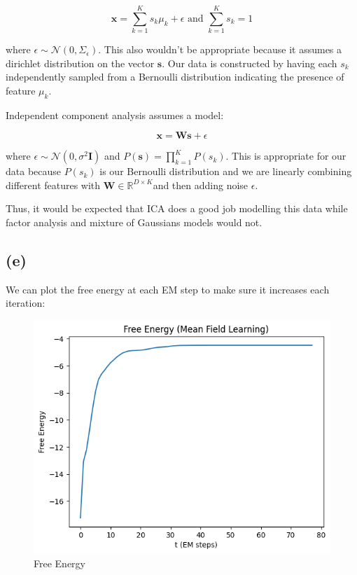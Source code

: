 \documentclass[12pt]{article}
\begin{document}
\[\textbf{x} = \sum_{k=1}^K s_k \mu_k + \epsilon \text{ and } \sum_{k=1}^K s_k = 1\]

where $\epsilon \sim \mathcal{N}(0, \Sigma_{\epsilon})$. This also wouldn't be appropriate because it assumes a dirichlet distribution on the vector $\textbf{s}$. Our data is constructed by having each $s_k$ independently sampled from a Bernoulli distribution indicating the presence of feature $\mu_k$.

Independent component analysis assumes a model:

\[\textbf{x} = \textbf{W}\textbf{s} + \epsilon\]

where $\epsilon \sim \mathcal{N}(0, \sigma^2\textbf{I})$ and $P(\textbf{s}) = \prod_{k=1}^K P(s_k)$. This is appropriate for our data because $P(s_k)$ is our Bernoulli distribution and we are linearly combining different features with $\textbf{W} \in \mathbb{R}^{D \times K}$and then adding noise $\epsilon$.

Thus, it would be expected that ICA does a good job modelling this data while factor analysis and mixture of Gaussians models would not.

\subsection*{(e)}

We can plot the free energy at each EM step to make sure it increases each iteration:

\begin{figure}[h]
\centering
\includegraphics[scale=0.4]{outputs/q3/f-free-energy}
\caption{Free Energy}
\label{fig:3f-free-energy}
\end{figure}
\newpage
\end{document}
